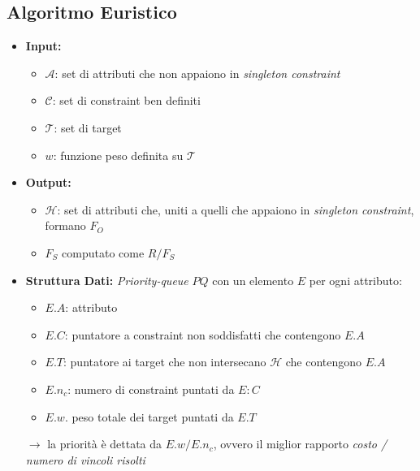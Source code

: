 \documentclass{report}
\begin{document}
\subsection{Algoritmo Euristico}
\begin{itemize}
    \item \textbf{Input:}
    \begin{itemize}
        \item $\mathcal{A}$: set di attributi che non appaiono in \textit{singleton constraint} 
        \item $\mathcal{C}$: set di constraint ben definiti 
        \item $\mathcal{T}$: set di target 
        \item $w$: funzione peso definita su $\mathcal{T}$
    \end{itemize}
    \item \textbf{Output:}
    \begin{itemize}
        \item $\mathcal{H}$: set di attributi che, uniti a quelli che appaiono in \textit{singleton constraint}, formano $F_O$
        \item $F_S$ computato come $R / F_S$
    \end{itemize}
    \item \textbf{Struttura Dati:}
    \textit{Priority-queue} $PQ$ con un elemento $E$ per ogni attributo:
    \begin{itemize}
        \item $E.A$: attributo 
        \item $E.C$: puntatore a constraint non soddisfatti che contengono $E.A$
        \item $E.T$: puntatore ai target che non intersecano $\mathcal{H}$ che contengono $E.A$
        \item $E.n_c$: numero di constraint puntati da $E:C$
        \item $E.w$. peso totale dei target puntati da $E.T$
    \end{itemize}

    $\rightarrow$ la priorità è dettata da $E.w / E.n_c$, ovvero il miglior rapporto \textit{costo / numero di vincoli risolti}
\end{itemize}

\newpage
\end{document}

